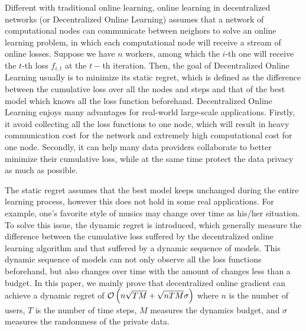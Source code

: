 \documentclass{article}
\begin{document}
Different with traditional online learning, online learning in decentralized networks (or Decentralized Online Learning) assumes that a network of computational nodes can communicate between neighors to solve an online learning problem, in which each computational node will receive a stream of online losses. Suppose we have $n$ workers, among which the $i$-th one will receive the $t$-th loss $f_{i,t}$ at the $t-$th iteration. Then, the goal of Decentralized Online Learning usually is to minimize its static regret, which is defined as the difference between the cumulative loss over all the nodes and steps and that of the best model which knows all the loss function beforehand. Decentralized Online Learning enjoys many advantages for real-world large-scale applications. Firstly, it avoid collecting all the loss functions to one node, which will result in heavy communication cost for the network and extremely high computational cost for one node. Secondly, it can help many data providers collaborate to better minimize their cumulative loss, while at the same time protect the data privacy as much as possible. 

The static regret assumes that the best model keeps unchanged during the entire learning process, however this does not hold in some real applications. For example, one's favorite style of musics may change over time as his/her situation. To solve this issue, the dynamic regret is introduced, which generally measure the difference between the cumulative loss suffered by the decentralized online learning algorithm and that suffered by a dynamic sequence of models. This dynamic sequence of models can not only observe all the loss functions beforehand, but also changes over time with the amount of changes less than a budget. In this paper, we mainly prove that decentralized online gradient can achieve a dynamic regret  of ${\mathcal{O}\left( n\sqrt{TM} + \sqrt{nTM}\sigma \right)}$ where $n$ is the number of users, $T$ is the number of time steps, $M$ measures the dynamics budget, and $\sigma$ measures the randomness of the private data. 
\end{document}
